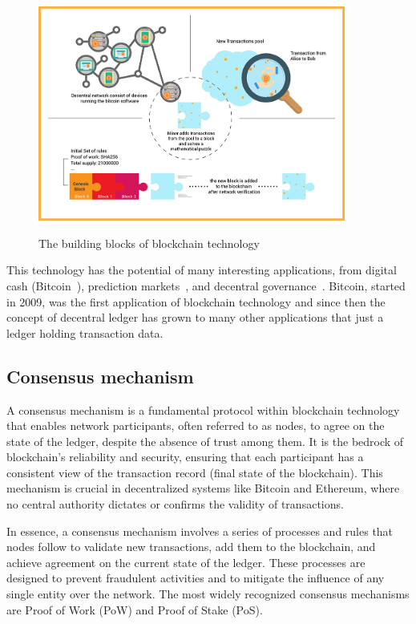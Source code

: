 \begin{figure}[h]
    \centering
    {\caption[The building blocks of blockchain technology]{The building blocks of blockchain technology}}
    {\includegraphics[width=0.9\textwidth]{figures/blockchain-buildingblocks.jpg}}
\end{figure}


This technology has the potential of many interesting applications, from digital cash (\eg Bitcoin~\cite{nakamoto2008bitcoin}), prediction markets~\cite{clark2014decentralizing}, and decentral governance~\cite{aragonwebsite}. Bitcoin, started in 2009, was the first application of blockchain technology and since then the concept of decentral ledger has grown to many other applications that just a ledger holding transaction data. 


\subsection{Consensus mechanism}\label{consensus_mechanism}
A consensus mechanism is a fundamental protocol within blockchain technology that enables network participants, often referred to as nodes, to agree on the state of the ledger, despite the absence of trust among them. It is the bedrock of blockchain's reliability and security, ensuring that each participant has a consistent view of the transaction record (final state of the blockchain). This mechanism is crucial in decentralized systems like Bitcoin and Ethereum, where no central authority dictates or confirms the validity of transactions.

In essence, a consensus mechanism involves a series of processes and rules that nodes follow to validate new transactions, add them to the blockchain, and achieve agreement on the current state of the ledger. These processes are designed to prevent fraudulent activities and to mitigate the influence of any single entity over the network. The most widely recognized consensus mechanisms are Proof of Work (PoW) and Proof of Stake (PoS).


